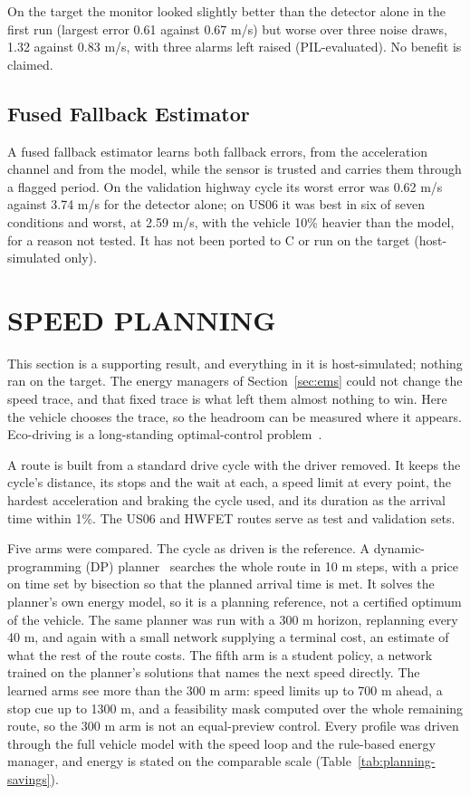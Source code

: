 \documentclass{ieeeaccess}
\begin{document}
On the target the monitor looked slightly better than the detector alone in the first run (largest error 0.61 against 0.67 m/s) but worse over three noise draws, 1.32 against 0.83 m/s, with three alarms left raised (PIL-evaluated). No benefit is claimed.

\subsection{Fused Fallback Estimator}

A fused fallback estimator learns both fallback errors, from the acceleration channel and from the model, while the sensor is trusted and carries them through a flagged period. On the validation highway cycle its worst error was 0.62 m/s against 3.74 m/s for the detector alone; on US06 it was best in six of seven conditions and worst, at 2.59 m/s, with the vehicle 10\% heavier than the model, for a reason not tested. It has not been ported to C or run on the target (host-simulated only).

\section{SPEED PLANNING}
\label{sec:planning}

This section is a supporting result, and everything in it is host-simulated; nothing ran on the target. The energy managers of Section~\ref{sec:ems} could not change the speed trace, and that fixed trace is what left them almost nothing to win. Here the vehicle chooses the trace, so the headroom can be measured where it appears. Eco-driving is a long-standing optimal-control problem~\cite{sciarretta2015}.

A route is built from a standard drive cycle with the driver removed. It keeps the cycle's distance, its stops and the wait at each, a speed limit at every point, the hardest acceleration and braking the cycle used, and its duration as the arrival time within 1\%. The US06 and HWFET routes serve as test and validation sets.

Five arms were compared. The cycle as driven is the reference. A dynamic-programming (DP) planner~\cite{bellman1957} searches the whole route in 10 m steps, with a price on time set by bisection so that the planned arrival time is met. It solves the planner's own energy model, so it is a planning reference, not a certified optimum of the vehicle. The same planner was run with a 300 m horizon, replanning every 40 m, and again with a small network supplying a terminal cost, an estimate of what the rest of the route costs. The fifth arm is a student policy, a network trained on the planner's solutions that names the next speed directly. The learned arms see more than the 300 m arm: speed limits up to 700 m ahead, a stop cue up to 1300 m, and a feasibility mask computed over the whole remaining route, so the 300 m arm is not an equal-preview control. Every profile was driven through the full vehicle model with the speed loop and the rule-based energy manager, and energy is stated on the comparable scale (Table~\ref{tab:planning-savings}).
\end{document}
